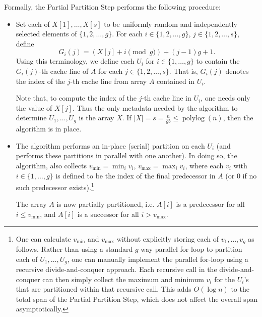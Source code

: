 \documentclass[11pt]{article}
\theoremstyle{remark}
\theoremstyle{remark}
\begin{document}
Formally, the Partial Partition Step performs the following procedure:
\begin{itemize}
\item Set each of $X[1], \ldots, X[s]$ to be uniformly random and
  independently selected elements of $\{1, 2, \ldots, g\}$. For each
  $i \in \{1, 2, \ldots, g\}$, $j \in \{1, 2, \ldots, s\}$, define
  $$G_i(j) = (X[j] + i \pmod g) + (j - 1)g + 1.$$ Using this
  terminology, we define each $U_i$ for $i \in \{1, \ldots, g\}$ to
  contain the $G_i(j)$-th cache line of $A$ for each $j \in \{1, 2,
  \ldots, s\}$. That is, $G_i(j)$ denotes the index of the $j$-th
  cache line from array $A$ contained in $U_i$.

  Note that, to compute the index of the $j$-th cache line in $U_i$,
  one needs only the value of $X[j]$. Thus the only metadata needed by
  the algorithm to determine $U_1, \ldots, U_g$ is the array
  $X$. If $|X| = s = \frac{n}{gb} \le \operatorname{polylog}(n)$, then
  the algorithm is in place.
  
\item The algorithm performs an in-place (serial) partition on each
  $U_i$ (and performs these partitions in parallel with one
  another). In doing so, the algorithm, also collects
  $v_{\text{min}}=\min_i{v_i}$, $v_{\text{max}}=\max_i{v_i}$, where
	each $v_i$ with $i \in \{1, \ldots, g\}$ is defined to be the index
  of the final predecessor in $A$ (or $0$ if no such predecessor
  exists).\footnote{One can calculate $v_{\text{min}}$ and
    $v_{\text{max}}$ without explicitly storing each of $v_1, \ldots,
		v_{g}$ as follows. Rather than using a standard $g$-way parallel
		for-loop to partition each of $U_1, \ldots, U_{g}$, one can
    manually implement the parallel for-loop using a recursive
    divide-and-conquer approach. Each recursive call in the
    divide-and-conquer can then simply collect the maximum and minimum
    $v_i$ for the $U_i$'s that are partitioned within that recursive
    call. This adds $O(\log n)$ to the total span of the Partial
    Partition Step, which does not affect the overall span
    asymptotically. %
  }
  
  The array $A$ is now partially partitioned, i.e. $A[i]$ is a
  predecessor for all $i \le v_{\text{min}}$, and $A[i]$ is a successor
  for all $i > v_{\text{max}}$.
\end{itemize}
\end{document}
